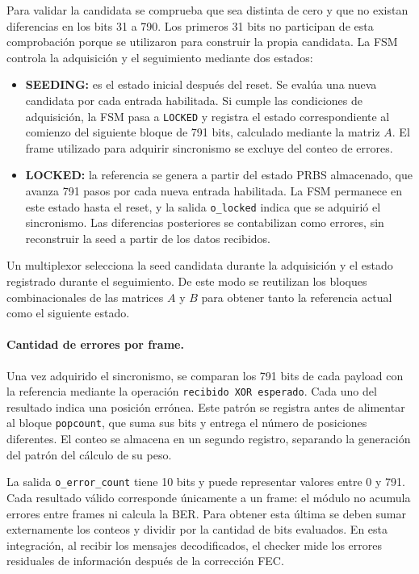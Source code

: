 \documentclass[10pt,a4paper]{article}
\begin{document}
Para validar la candidata se comprueba que sea distinta de cero y
que no existan diferencias en los bits 31 a 790. Los primeros 31 bits
no participan de esta comprobación porque se utilizaron para construir
la propia candidata. La FSM controla la adquisición y el seguimiento
mediante dos estados:

\begin{itemize}
    \item \textbf{SEEDING:} es el estado inicial después del reset.
    Se evalúa una nueva candidata por cada entrada habilitada. Si
    cumple las condiciones de adquisición, la FSM pasa a
    \texttt{LOCKED} y registra el estado correspondiente al comienzo
    del siguiente bloque de 791 bits, calculado mediante la matriz $A$.
    El frame utilizado para adquirir sincronismo se excluye del
    conteo de errores.

    \item \textbf{LOCKED:} la referencia se genera a partir del
    estado PRBS almacenado, que avanza 791 pasos por cada nueva
    entrada habilitada. La FSM permanece en este estado hasta el
    reset, y la salida \texttt{o\_locked} indica que se adquirió el
    sincronismo. Las diferencias posteriores se contabilizan como
    errores, sin reconstruir la seed a partir de los datos recibidos.
\end{itemize}

Un multiplexor selecciona la seed candidata durante la adquisición
y el estado registrado durante el seguimiento. De este modo se
reutilizan los bloques combinacionales de las matrices $A$ y $B$
para obtener tanto la referencia actual como el siguiente estado.

\paragraph{Cantidad de errores por frame.}
Una vez adquirido el sincronismo, se comparan los 791 bits de cada
payload con la referencia mediante la operación
\texttt{recibido XOR esperado}. Cada uno del resultado indica una
posición errónea. Este patrón se registra antes de alimentar al
bloque \texttt{popcount}, que suma sus bits y entrega el número de
posiciones diferentes. El conteo se almacena en un segundo registro,
separando la generación del patrón del cálculo de su peso.

La salida \texttt{o\_error\_count} tiene 10 bits y puede representar
valores entre 0 y 791. Cada resultado válido corresponde únicamente
a un frame: el módulo no acumula errores entre frames ni calcula
la BER. Para obtener esta última se deben sumar externamente los
conteos y dividir por la cantidad de bits evaluados. En esta
integración, al recibir los mensajes decodificados, el checker mide
los errores residuales de información después de la corrección FEC.
\end{document}
